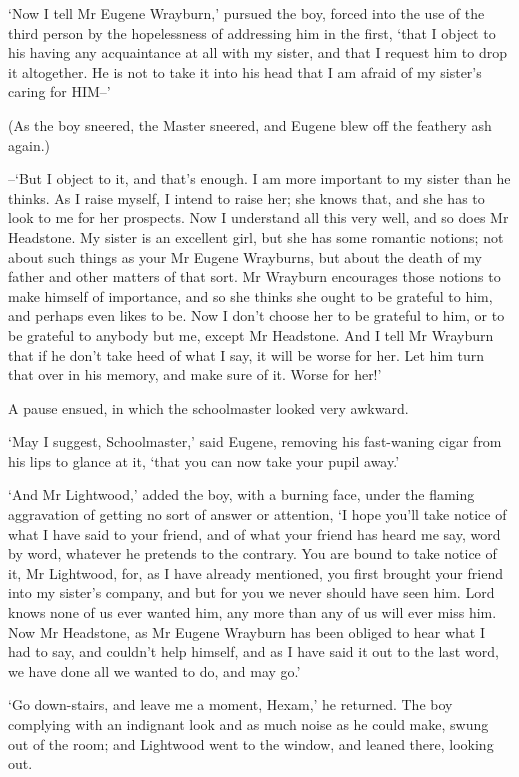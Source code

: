 ‘Now I tell Mr Eugene Wrayburn,’ pursued the boy, forced into the use
of the third person by the hopelessness of addressing him in the first,
‘that I object to his having any acquaintance at all with my sister, and
that I request him to drop it altogether. He is not to take it into his
head that I am afraid of my sister’s caring for HIM--’

(As the boy sneered, the Master sneered, and Eugene blew off the
feathery ash again.)

--‘But I object to it, and that’s enough. I am more important to my
sister than he thinks. As I raise myself, I intend to raise her;
she knows that, and she has to look to me for her prospects. Now I
understand all this very well, and so does Mr Headstone. My sister is an
excellent girl, but she has some romantic notions; not about such things
as your Mr Eugene Wrayburns, but about the death of my father and other
matters of that sort. Mr Wrayburn encourages those notions to make
himself of importance, and so she thinks she ought to be grateful to
him, and perhaps even likes to be. Now I don’t choose her to be grateful
to him, or to be grateful to anybody but me, except Mr Headstone. And
I tell Mr Wrayburn that if he don’t take heed of what I say, it will be
worse for her. Let him turn that over in his memory, and make sure of
it. Worse for her!’

A pause ensued, in which the schoolmaster looked very awkward.

‘May I suggest, Schoolmaster,’ said Eugene, removing his fast-waning
cigar from his lips to glance at it, ‘that you can now take your pupil
away.’

‘And Mr Lightwood,’ added the boy, with a burning face, under the
flaming aggravation of getting no sort of answer or attention, ‘I hope
you’ll take notice of what I have said to your friend, and of what
your friend has heard me say, word by word, whatever he pretends to the
contrary. You are bound to take notice of it, Mr Lightwood, for, as I
have already mentioned, you first brought your friend into my sister’s
company, and but for you we never should have seen him. Lord knows none
of us ever wanted him, any more than any of us will ever miss him. Now
Mr Headstone, as Mr Eugene Wrayburn has been obliged to hear what I had
to say, and couldn’t help himself, and as I have said it out to the last
word, we have done all we wanted to do, and may go.’

‘Go down-stairs, and leave me a moment, Hexam,’ he returned. The boy
complying with an indignant look and as much noise as he could make,
swung out of the room; and Lightwood went to the window, and leaned
there, looking out.

